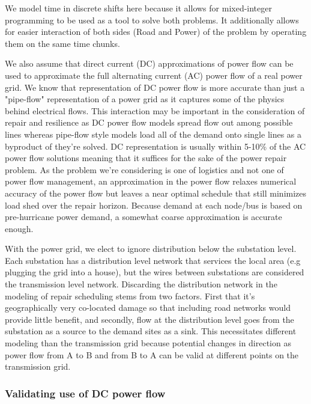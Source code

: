 \documentclass{article}
\begin{document}
	We model time in discrete shifts here because it allows for mixed-integer programming to be used as a tool to solve both problems. It additionally allows for easier interaction of both sides (Road and Power) of the problem by operating them on the same time chunks.
	
	We also assume that direct current (DC) approximations of power flow can be used to approximate the full alternating current (AC) power flow of a real power grid. We know that representation of DC power flow is more accurate than just a "pipe-flow" representation of a power grid as it captures some of the physics behind electrical flows. This interaction may be important in the consideration of repair and resilience as DC power flow models spread flow out among possible lines whereas pipe-flow style models load all of the demand onto single lines as a byproduct of they're solved. DC representation is usually within 5-10\% of the AC power flow solutions \cite{Frank2016} \cite{StottEA2009} meaning that it suffices for the sake of the power repair problem. As the problem we're considering is one of logistics and not one of power flow management, an approximation in the power flow relaxes numerical accuracy of the power flow but leaves a near optimal schedule that still minimizes load shed over the repair horizon. Because demand at each node/bus is based on pre-hurricane power demand, a somewhat coarse approximation is accurate enough.  
	
	With the power grid, we elect to ignore distribution below the substation level. Each substation has a distribution level network that services the local area (e.g plugging the grid into a house), but the wires between substations are considered the transmission level network. Discarding the distribution network in the modeling of repair scheduling stems from two factors. First that it's geographically very co-located damage so that including road networks would provide little benefit, and secondly, flow at the distribution level goes from the substation as a source to the demand sites as a sink. This necessitates different modeling than the transmission grid because potential changes in direction as power flow from A to B and from B to A can be valid at different points on the transmission grid.
	\subsubsection{Validating use of DC power flow}
	
\end{document}
